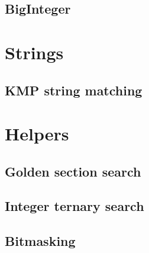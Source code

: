 \documentclass[a4paper]{article}
\newcommand{\includesnippet}[2]{

}
\begin{document}
    \subsection{BigInteger}
        
  \section{Strings}
  
    \subsection{KMP string matching}
    
  \section{Helpers}
  
    \subsection{Golden section search}
    \includesnippet{snippets/goldensectionsearch.cpp}{C++}
    
    \subsection{Integer ternary search}
    
    \subsection{Bitmasking}
    \includesnippet{snippets/bitmasking.cpp}{C++}
    
\end{document}
